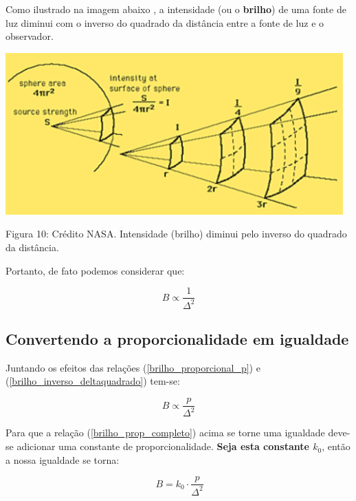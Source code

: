 \documentclass[a4paper, 12pt]{article}
\begin{document}
Como ilustrado na imagem abaixo \citep{site_nasa_imagem_distancia}, a intensidade (ou o \textbf{brilho}) de uma fonte de luz diminui com o inverso do quadrado da distância entre a fonte de luz e o observador.

\begin{center}
    \includegraphics[width=13cm]{09-nasa-distancia.PNG}
    
    Figura 10: Crédito NASA. Intensidade (brilho) diminui pelo inverso do quadrado da distância.
\end{center}

Portanto, de fato podemos considerar que:

\begin{equation}\label{brilho_inverso_deltaquadrado}
    B\propto \frac{1}{\Delta ^2}
\end{equation}

\subsection{Convertendo a proporcionalidade em igualdade}

Juntando os efeitos das relações (\ref{brilho_proporcional_p}) e (\ref{brilho_inverso_deltaquadrado}) tem-se:

\begin{equation}\label{brilho_prop_completo}
    B\propto \frac{p}{\Delta ^2}
\end{equation}

Para que a relação (\ref{brilho_prop_completo}) acima se torne uma igualdade deve-se adicionar uma constante de proporcionalidade. \textbf{Seja esta constante $k_0$}, então a nossa igualdade se torna:

\begin{equation}\label{brilho_igualdade_completo}
    \ \boxed{\ B=k_0\cdot \frac{p}{\Delta ^2}\ }
\end{equation}
\end{document}
